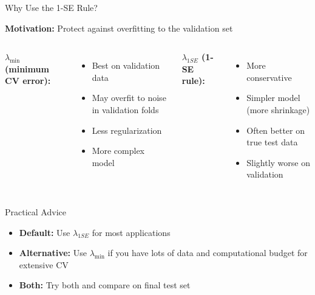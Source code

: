 \documentclass[10pt]{beamer}
\begin{document}
\begin{frame}{Why Use the 1-SE Rule?}

\textbf{Motivation:} Protect against overfitting to the validation set

\vspace{1em}
\begin{columns}[T]
\textbf{$\lambda_{\min}$ (minimum CV error):}
\begin{itemize}
  \item[$+$] Best on validation data
  \item[$-$] May overfit to noise in validation folds
  \item[$-$] Less regularization
  \item[$-$] More complex model
\end{itemize}

\textbf{$\lambda_{1SE}$ (1-SE rule):}
\begin{itemize}
  \item[$+$] More conservative
  \item[$+$] Simpler model (more shrinkage)
  \item[$+$] Often better on true test data
  \item[$-$] Slightly worse on validation
\end{itemize}
\end{columns}

\vspace{1em}
\begin{block}{Practical Advice}
\begin{itemize}
  \item \textbf{Default:} Use $\lambda_{1SE}$ for most applications
  \item \textbf{Alternative:} Use $\lambda_{\min}$ if you have lots of data and computational budget for extensive CV
  \item \textbf{Both:} Try both and compare on final test set
\end{itemize}
\end{block}
\end{frame}

\end{document}
